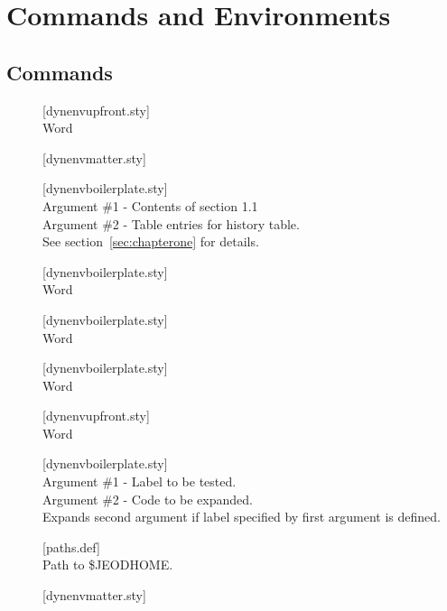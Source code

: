 \section{Commands and Environments}
\subsection{Commands}
\begin{description}
\item[]
  \hfill [dynenvupfront.sty] \\
  Word
\item[]
  \hfill [dynenvmatter.sty] \\
\item[]
  \hfill [dynenvboilerplate.sty] \\
  Argument \#1 - Contents of section 1.1 \\
  Argument \#2 - Table entries for history table. \\
  See section~\ref{sec:chapterone} for details.
\item[] \hfill [dynenvboilerplate.sty] \\
  Word
\item[] \hfill [dynenvboilerplate.sty] \\
  Word
\item[] \hfill [dynenvboilerplate.sty] \\
  Word
\item[]
  \hfill [dynenvupfront.sty] \\
  Word
\item[]
  \hfill [dynenvboilerplate.sty] \\
  Argument \#1 - Label to be tested.\\
  Argument \#2 - Code to be expanded. \\
  Expands second argument if label specified by first argument is defined.
\item[] \hfill [paths.def] \\
  Path to \$JEODHOME.
\item[]
  \hfill [dynenvmatter.sty] \\

\end{description}
